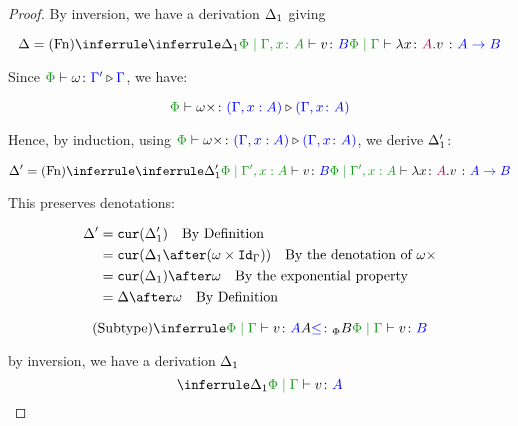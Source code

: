 \documentclass{report}
\begin{document}
\begin{framed}
\begin{proof}
        
            \case{\vfun}
            By inversion, we have a derivation $\Delta_1$ giving
        
            \begin{equation}
                \D = \ntreeruleI{\vfun}{
                    \treeruleI{\D_1}{\etyperelation{\P}{\gax}{v}{B}}
                }{\gpetyperelation{\lam{x}{A}{v}}{\ab}}
            \end{equation}
        
            Since $\ewrel{\P}{\w}{\G'}{\G}$, we have:
        
            \begin{equation}
                \ewrel{\P}{\w\x}{(\G,x:  A)}{(\gax)}
            \end{equation}
        
            Hence, by induction, using $\ewrel{\P}{\w\x}{(\G,x:  A)}{(\gax)}$, we derive $\Delta_1'$:
        
            \begin{equation}
                \D' = \ntreeruleI{\vfun}{
                    \treeruleI{\D_1'}{\etyperelation{\P}{\G',x: A}{v}{B}}
                }{\etyperelation{\P}{\G',x: A}{\lam{x}{A}{v}}{\ab}}
            \end{equation}
        
            This preserves denotations:
        
        
            \begin{align*}
            \D' & = \cur{\D_1'} \qt{By Definition}\\
            & = \cur{\D_1\after(\w\times \idg)}\qt{By the denotation of $\w\x$} \\
            &= \cur{\D_1}\after\w\qt{By the exponential property}\\
            &= \D\after \w \qt{By Definition}
            \end{align*}
        
        
            \case{\vsubtype}
        
            \begin{equation}
                \ntreeruleII{\vsubtype}{\gpetyperelation{v}{A}}{ A\subtypep B}{\gpetyperelation{v}{B}}
            \end{equation}
        
            by inversion, we have a derivation $\Delta_1$
            \begin{equation}
                \treeruleI{\D_1}{\gpetyperelation{v}{A}}
            \end{equation}
        

\end{proof}
\end{framed}
\end{document}
